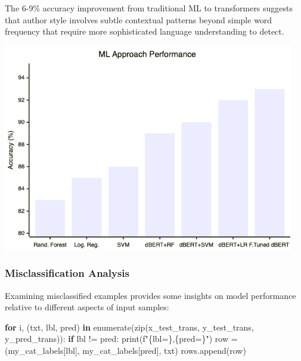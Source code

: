 \documentclass[
]{article}
\newenvironment{Shaded}{}{}
\newcommand{\BuiltInTok}[1]{\textcolor[rgb]{0.00,0.50,0.00}{#1}}
\newcommand{\ControlFlowTok}[1]{\textcolor[rgb]{0.00,0.44,0.13}{\textbf{#1}}}
\newcommand{\KeywordTok}[1]{\textcolor[rgb]{0.00,0.44,0.13}{\textbf{#1}}}
\newcommand{\NormalTok}[1]{#1}
\newcommand{\OperatorTok}[1]{\textcolor[rgb]{0.40,0.40,0.40}{#1}}
\newcommand{\SpecialCharTok}[1]{\textcolor[rgb]{0.25,0.44,0.63}{#1}}
\newcommand{\SpecialStringTok}[1]{\textcolor[rgb]{0.73,0.40,0.53}{#1}}
\begin{document}
The 6-9\% accuracy improvement from traditional ML to transformers
suggests that author style involves subtle contextual patterns beyond
simple word frequency that require more sophisticated language
understanding to detect.

\includegraphics[width=0.95\textwidth,height=\textheight]{image-20250611165131238.png}

\subsubsection{Misclassification
Analysis}\label{misclassification-analysis}

Examining misclassified examples provides some insights on model performance relative to different aspects of input samples:

\begin{Shaded}
\begin{Highlighting}[]
\ControlFlowTok{for}\NormalTok{ i, (txt, lbl, pred) }\KeywordTok{in} \BuiltInTok{enumerate}\NormalTok{(}\BuiltInTok{zip}\NormalTok{(x\_test\_trans, y\_test\_trans, y\_pred\_trans)):}
    \ControlFlowTok{if}\NormalTok{ lbl }\OperatorTok{!=}\NormalTok{ pred:}
        \BuiltInTok{print}\NormalTok{(}\SpecialStringTok{f"}\SpecialCharTok{\{}\NormalTok{lbl}\OperatorTok{=}\SpecialCharTok{\}}\SpecialStringTok{,}\SpecialCharTok{\{}\NormalTok{pred}\OperatorTok{=}\SpecialCharTok{\}}\SpecialStringTok{"}\NormalTok{)}
\NormalTok{        row }\OperatorTok{=}\NormalTok{(my\_cat\_labels[lbl], my\_cat\_labels[pred], txt)}
\NormalTok{        rows.append(row)}
\end{Highlighting}
\end{Shaded}
\end{document}
